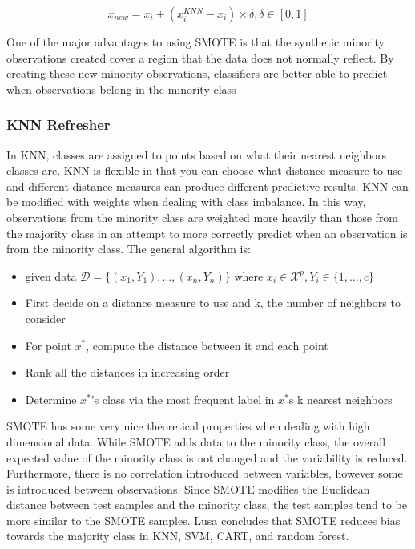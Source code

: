 \documentclass[a4paper]{article}
\begin{document}
$$x_{new}=x_i+(x_i^{KNN}-x_i)\times\delta, \delta\in[0,1]$$

One of the major advantages to using SMOTE is that the synthetic minority observations created cover a region that the data does not normally reflect. By creating these new minority observations, classifiers are better able to predict when observations belong in the minority class

\subsubsection{KNN Refresher}
In KNN, classes are assigned to points based on what their nearest neighbors classes are. KNN is flexible in that you can choose what distance measure to use and different distance measures can produce different predictive results. KNN can be modified with weights when dealing with class imbalance. In this way, observations from the minority class are weighted more heavily than those from the majority class in an attempt to more correctly predict when an observation is from the minority class. The general algorithm is:

\begin{itemize}
\item given data $\mathcal{D}=\{(x_1,Y_1),\dots,(x_n,Y_n)\}$ where $x_i\in\mathcal{X}^p, Y_i\in\{1,\dots,c\}$
\item First decide on a distance measure to use and k, the number of neighbors to consider
\item For point $x^*$, compute the distance between it and each point
\item Rank all the distances in increasing order
\item Determine $x^*$'s class via the most frequent label in $x^*$s k nearest neighbors
\end{itemize} 
    SMOTE has some very nice theoretical properties when dealing with high dimensional data. While SMOTE adds data to the minority class, the overall expected value of the minority class is not changed and the variability is reduced. Furthermore, there is no correlation introduced between variables, however some is introduced between observations. Since SMOTE modifies the Euclidean distance between test samples and the minority class, the test samples tend to be more similar to the SMOTE samples. Lusa concludes that SMOTE reduces bias towards the majority class in KNN, SVM, CART, and random forest.%
\end{document}
